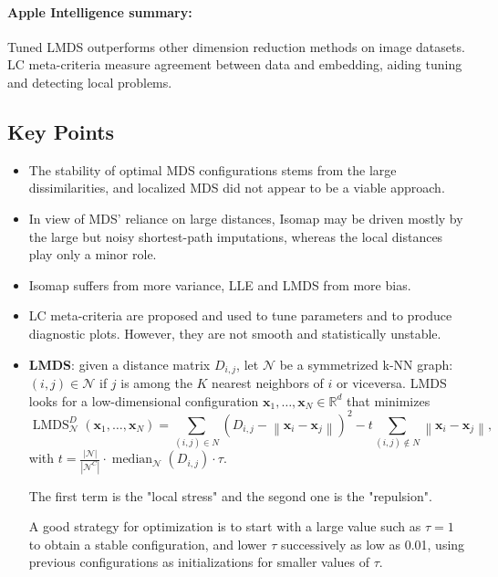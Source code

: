 \documentclass[a4paper,12pt]{article}
\begin{document}
\paragraph{Apple Intelligence summary:} Tuned LMDS outperforms other dimension reduction methods on image datasets.  LC meta-criteria measure agreement between data and embedding, aiding tuning and detecting local problems.

\subsection{Key Points}

\begin{itemize}
    \item The stability of optimal MDS configurations stems from the large dissimilarities, and localized MDS did not appear to be a viable approach. \item In view of MDS' reliance on large distances, Isomap may be driven mostly by the large but noisy shortest-path imputations, whereas the local distances play only a minor role.
    \item Isomap suffers from more variance, LLE and LMDS from more bias.
    \item LC meta-criteria are proposed and used to tune parameters and to produce diagnostic plots. However, they are not smooth and statistically unstable.
    \item \textbf{LMDS}: given a distance matrix $D_{i,j}$, let $\mathcal{N}$ be a symmetrized k-NN graph: $(i,j)\in\mathcal{N}$ if $j$ is among the $K$ nearest neighbors of $i$ or viceversa. LMDS looks for a low-dimensional configuration $\mathbf{x}_1, \dots, \mathbf{x}_N \in \mathbb{R}^d$ that minimizes
    $$
    \operatorname{LMDS}_{\mathcal{N}}^D\left(\mathbf{x}_1, \ldots, \mathbf{x}_N\right)= \sum_{(i, j) \in N}\left(D_{i, j}-\left\|\mathbf{x}_i-\mathbf{x}_j\right\|\right)^2 - t \sum_{(i, j) \notin N}\left\|\mathbf{x}_i-\mathbf{x}_j\right\|,
    $$
    with $t=\frac{|\mathcal{N}|}{\left|\mathcal{N}^C\right|} \cdot \operatorname{median}_{\mathcal{N}}\left(D_{i, j}\right) \cdot \tau$.

    The first term is the "local stress" and the segond one is the "repulsion".

    A good strategy for optimization is to start with a large value such as $\tau = 1$ to obtain a stable configuration, and lower $\tau$ successively as low as 0.01, using previous configurations as initializations for smaller values of $\tau$.


\end{itemize}
\end{document}
